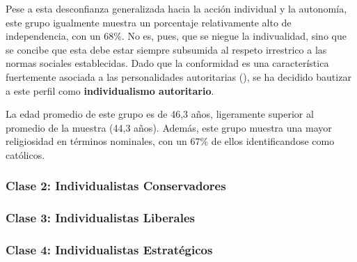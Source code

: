 \documentclass[
  letterpaper,
  DIV=11,
  numbers=noendperiod]{scrartcl}
\begin{document}
Pese a esta desconfianza generalizada hacia la acción individual y la
autonomía, este grupo igualmente muestra un porcentaje relativamente
alto de independencia, con un 68\%. No es, pues, que se niegue la
indivualidad, sino que se concibe que esta debe estar siempre subsumida
al respeto irrestrico a las normas sociales establecidas. Dado que la
conformidad es una característica fuertemente asociada a las
personalidades autoritarias (), se ha decidido bautizar a este perfil como
\textbf{individualismo autoritario}.

La edad promedio de este grupo es de 46,3 años, ligeramente superior al
promedio de la muestra (44,3 años). Además, este grupo muestra una mayor
religiosidad en términos nominales, con un 67\% de ellos identificandose
como católicos.

\subsubsection{Clase 2: Individualistas
Conservadores}\label{clase-2-individualistas-conservadores}

\subsubsection{Clase 3: Individualistas
Liberales}\label{clase-3-individualistas-liberales}

\subsubsection{Clase 4: Individualistas
Estratégicos}\label{clase-4-individualistas-estratuxe9gicos}
\end{document}

